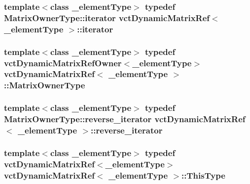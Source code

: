 \hypertarget{classvct_dynamic_matrix_ref_a96cb0ad0104a135e19f1e39567a16ef2}{
\subsubsection[{iterator}]{\setlength{\rightskip}{0pt plus 5cm}template$<$class \-\_\-element\-Type$>$ typedef {\bf Matrix\-Owner\-Type\-::iterator} {\bf vct\-Dynamic\-Matrix\-Ref}$<$ \-\_\-element\-Type $>$\-::{\bf iterator}}}\label{classvct_dynamic_matrix_ref_a96cb0ad0104a135e19f1e39567a16ef2}
\hypertarget{classvct_dynamic_matrix_ref_a24cb066b24bdc74c68af35e7c88f8a07}{
\subsubsection[{Matrix\-Owner\-Type}]{\setlength{\rightskip}{0pt plus 5cm}template$<$class \-\_\-element\-Type$>$ typedef {\bf vct\-Dynamic\-Matrix\-Ref\-Owner}$<$\-\_\-element\-Type$>$ {\bf vct\-Dynamic\-Matrix\-Ref}$<$ \-\_\-element\-Type $>$\-::{\bf Matrix\-Owner\-Type}}}\label{classvct_dynamic_matrix_ref_a24cb066b24bdc74c68af35e7c88f8a07}
\hypertarget{classvct_dynamic_matrix_ref_ad797e9f33fe82864e8df2c8c6a30b383}{
\subsubsection[{reverse\-\_\-iterator}]{\setlength{\rightskip}{0pt plus 5cm}template$<$class \-\_\-element\-Type$>$ typedef {\bf Matrix\-Owner\-Type\-::reverse\-\_\-iterator} {\bf vct\-Dynamic\-Matrix\-Ref}$<$ \-\_\-element\-Type $>$\-::{\bf reverse\-\_\-iterator}}}\label{classvct_dynamic_matrix_ref_ad797e9f33fe82864e8df2c8c6a30b383}
\hypertarget{classvct_dynamic_matrix_ref_ac01200e3df0afe95f5d3948da84c8551}{
\subsubsection[{This\-Type}]{\setlength{\rightskip}{0pt plus 5cm}template$<$class \-\_\-element\-Type$>$ typedef {\bf vct\-Dynamic\-Matrix\-Ref}$<$\-\_\-element\-Type$>$ {\bf vct\-Dynamic\-Matrix\-Ref}$<$ \-\_\-element\-Type $>$\-::{\bf This\-Type}}}\label{classvct_dynamic_matrix_ref_ac01200e3df0afe95f5d3948da84c8551}


